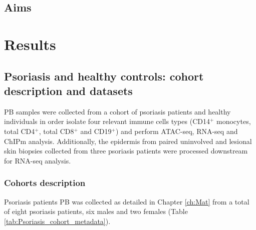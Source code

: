 \subsection{Aims}


\section{Results}
\subsection{Psoriasis and healthy controls: cohort description and datasets}
PB samples were collected from a cohort of psoriasis patients and healthy individuals in order isolate four relevant immune cells types (CD14$^+$ monocytes, total CD4$^+$, total CD8$^+$ and CD19$^+$) and perform ATAC-seq, RNA-seq and ChIPm analysis. Additionally, the epidermis from paired uninvolved and lesional skin biopsies collected from three psoriasis patients were processed downstream for RNA-seq analysis.

\subsubsection{Cohorts description}

Psoriasis patients PB was collected as detailed in Chapter \ref{ch:Mat} from a total of eight psoriasis patients, six males and two females (Table \ref{tab:Psoriasis_cohort_metadata}). 

